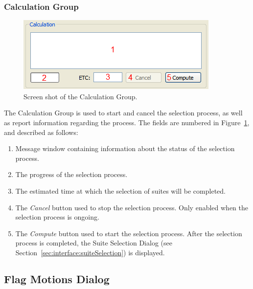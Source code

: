 \documentclass[11pt]{article}
\begin{document}
\FloatBarrier
\subsubsection{Calculation Group}
\label{sec:interface:calculation}

\begin{figure}[h]
  \begin{center}
	\includegraphics[scale=0.7]{screenshots/calculation}
  \end{center}
  \caption{Screen shot of the Calculation Group.}
  \label{fig:interface:calculation}
\end{figure}

The Calculation Group is used to start and cancel the selection process, as
well as report information regarding the process. The fields are numbered in
Figure~\ref{fig:interface:calculation}, and described as follows:
\begin{enumerate}
  \item Message window containing information about the status of the selection
	process.
  \item The progress of the selection process.
  \item The estimated time at which the selection of suites will be completed.
  \item The \emph{Cancel} button used to stop the selection process. Only
	enabled when the selection process is ongoing.
  \item The \emph{Compute} button used to start the selection process. After
	the selection process is completed, the Suite Selection Dialog (see
	Section~\ref{sec:interface:suiteSelection}) is displayed.
\end{enumerate}

\FloatBarrier
\subsection{Flag Motions Dialog}
\label{sec:interface:flagMotions}
\end{document}
